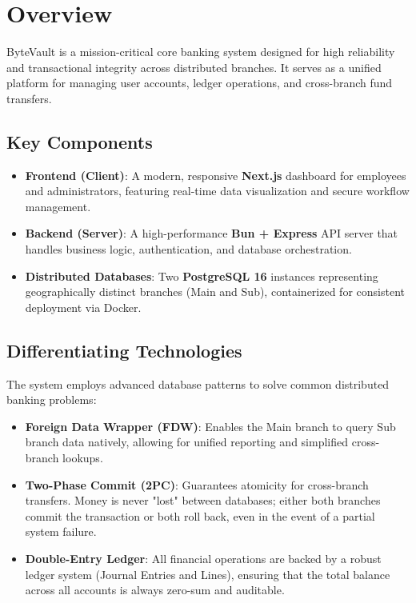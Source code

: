 \section{Overview}
ByteVault is a mission-critical core banking system designed for high reliability and transactional integrity across distributed branches. It serves as a unified platform for managing user accounts, ledger operations, and cross-branch fund transfers.

\subsection{Key Components}
\begin{itemize}
  \item \textbf{Frontend (Client)}: A modern, responsive \textbf{Next.js} dashboard for employees and administrators, featuring real-time data visualization and secure workflow management.
  \item \textbf{Backend (Server)}: A high-performance \textbf{Bun + Express} API server that handles business logic, authentication, and database orchestration.
  \item \textbf{Distributed Databases}: Two \textbf{PostgreSQL 16} instances representing geographically distinct branches (Main and Sub), containerized for consistent deployment via Docker.
\end{itemize}

\subsection{Differentiating Technologies}
The system employs advanced database patterns to solve common distributed banking problems:
\begin{itemize}
  \item \textbf{Foreign Data Wrapper (FDW)}: Enables the Main branch to query Sub branch data natively, allowing for unified reporting and simplified cross-branch lookups.
  \item \textbf{Two-Phase Commit (2PC)}: Guarantees atomicity for cross-branch transfers. Money is never "lost" between databases; either both branches commit the transaction or both roll back, even in the event of a partial system failure.
  \item \textbf{Double-Entry Ledger}: All financial operations are backed by a robust ledger system (Journal Entries and Lines), ensuring that the total balance across all accounts is always zero-sum and auditable.
\end{itemize}
